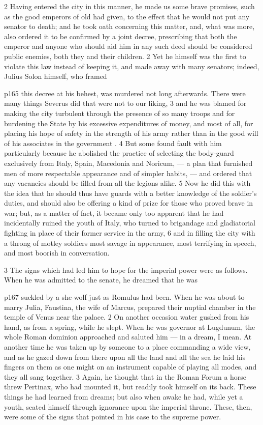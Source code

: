 2
Having entered the city in this manner, he made us some brave promises, such as the good emperors of old had given, to the effect that he would not put any senator to death; and he took oath concerning this matter, and, what was more, also ordered it to be confirmed by a joint decree, prescribing that both the emperor and anyone who should aid him in any such deed should be considered public enemies, both they and their children. 2 Yet he himself was the first to violate this law instead of keeping it, and made away with many senators; indeed, Julius Solon himself, who framed

p165 this decree at his behest, was murdered not long afterwards. There were many things Severus did that were not to our liking, 3 and he was blamed for making the city turbulent through the presence of so many troops and for burdening the State by his excessive expenditures of money, and most of all, for pla­cing his hope of safety in the strength of his army rather than in the good will of his associates in the government . 4 But some found fault with him particularly because he abolished the practice of selecting the body-guard exclusively from Italy, Spain, Macedonia and Noricum, \texthebrew{—} a plan that furnished men of more respectable appearance and of simpler habits, \texthebrew{—} and ordered that any vacancies should be filled from all the legions alike. 5 Now he did this with the idea that he should thus have guards with a better knowledge of the soldier's duties, and should also be offering a kind of prize for those who proved brave in war; but, as a matter of fact, it became only too apparent that he had incidentally ruined the youth of Italy, who turned to brigandage and gladiatorial fighting in place of their former service in the army, 6 and in filling the city with a throng of motley soldiers most savage in appearance, most terrifying in speech, and most boorish in conversation.

3
The signs which had led him to hope for the imperial power were as follows. When he was admitted to the senate, he dreamed that he was

p167 suckled by a she-wolf just as Romulus had been. When he was about to marry Julia, Faustina, the wife of Marcus, prepared their nuptial chamber in the temple of Venus near the palace. 2 On another occasion water gushed from his hand, as from a spring, while he slept. When he was governor at Lugdunum, the whole Roman dominion approached and saluted him \texthebrew{—} in a dream, I mean. At another time he was taken up by someone to a place commanding a wide view, and as he gazed down from there upon all the land and all the sea he laid his fingers on them as one might on an instrument capable of playing all modes, and they all sang together. 3 Again, he thought that in the Roman Forum a horse threw Pertinax, who had mounted it, but readily took himself on its back. These things he had learned from dreams; but also when awake he had, while yet a youth, seated himself through ignorance upon the imperial throne. These, then, were some of the signs that pointed in his case to the supreme power.

